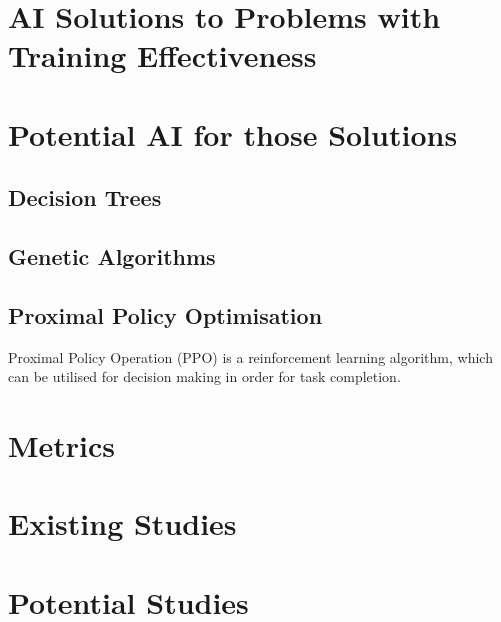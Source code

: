 \documentclass{article}
\begin{document}
\section{AI Solutions to Problems with Training Effectiveness}



\section{Potential AI for those Solutions}

\subsection{Decision Trees}

\subsection{Genetic Algorithms}

\subsection{Proximal Policy Optimisation}

Proximal Policy Operation (PPO) is a reinforcement learning algorithm, which can be utilised for decision making in order for task completion. \cite{schulman2017proximal}

\section{Metrics}

\section{Existing Studies}

\section{Potential Studies}

{}

\end{document}
